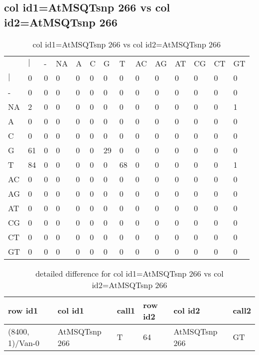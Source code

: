 \subsection{col id1=AtMSQTsnp 266 vs col id2=AtMSQTsnp 266}
\begin{center}
\begin{longtable}{|l|l|l|l|l|l|l|l|l|l|l|l|l|l|}
\caption{col id1=AtMSQTsnp 266 vs col id2=AtMSQTsnp 266} \label{table_dm616}\\
\hline
\\
\hline
&$|$&-&NA&A&C&G&T&AC&AG&AT&CG&CT&GT\\
$|$&0&0&0&0&0&0&0&0&0&0&0&0&0\\
-&0&0&0&0&0&0&0&0&0&0&0&0&0\\
NA&2&0&0&0&0&0&0&0&0&0&0&0&1\\
A&0&0&0&0&0&0&0&0&0&0&0&0&0\\
C&0&0&0&0&0&0&0&0&0&0&0&0&0\\
G&61&0&0&0&0&29&0&0&0&0&0&0&0\\
T&84&0&0&0&0&0&68&0&0&0&0&0&1\\
AC&0&0&0&0&0&0&0&0&0&0&0&0&0\\
AG&0&0&0&0&0&0&0&0&0&0&0&0&0\\
AT&0&0&0&0&0&0&0&0&0&0&0&0&0\\
CG&0&0&0&0&0&0&0&0&0&0&0&0&0\\
CT&0&0&0&0&0&0&0&0&0&0&0&0&0\\
GT&0&0&0&0&0&0&0&0&0&0&0&0&0\\
\hline
\end{longtable}
\end{center}

\begin{center}
\begin{longtable}{|l|l|l|l|l|l|}
\caption{detailed difference for col id1=AtMSQTsnp 266 vs col id2=AtMSQTsnp 266} \label{table_dm617}\\
\hline
row id1&col id1&call1&row id2&col id2&call2\\
\hline
(8400, 1)/Van-0&AtMSQTsnp 266&T&64&AtMSQTsnp 266&GT\\
\hline
\end{longtable}
\end{center}

